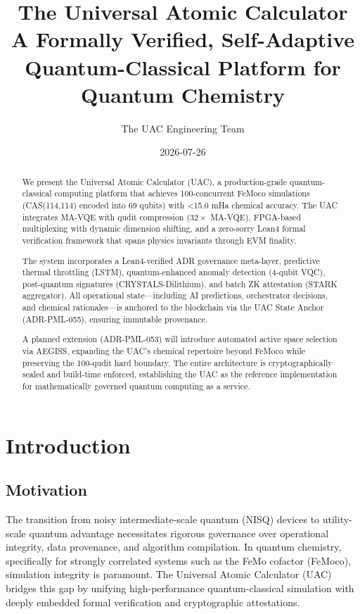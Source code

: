 \documentclass[11pt,a4paper]{article}
\title{The Universal Atomic Calculator\\ A Formally Verified, Self-Adaptive Quantum-Classical Platform for Quantum Chemistry}
\author{The UAC Engineering Team}
\date{2026-07-26}
\begin{document}
\maketitle

\begin{abstract}
We present the Universal Atomic Calculator (UAC), a production-grade quantum-classical computing platform that achieves 100-concurrent FeMoco simulations (CAS(114,114) encoded into 69 qubits) with <15.0 mHa chemical accuracy. The UAC integrates MA-VQE with qudit compression ($32\times$ MA-VQE), FPGA-based multiplexing with dynamic dimension shifting, and a zero-sorry Lean4 formal verification framework that spans physics invariants through EVM finality.

The system incorporates a Lean4-verified ADR governance meta-layer, predictive thermal throttling (LSTM), quantum-enhanced anomaly detection (4-qubit VQC), post-quantum signatures (CRYSTALS-Dilithium), and batch ZK attestation (STARK aggregator). All operational state—including AI predictions, orchestrator decisions, and chemical rationales—is anchored to the blockchain via the UAC State Anchor (ADR-PML-055), ensuring immutable provenance.

A planned extension (ADR-PML-053) will introduce automated active space selection via AEGISS, expanding the UAC's chemical repertoire beyond FeMoco while preserving the 100-qudit hard boundary. The entire architecture is cryptographically sealed and build-time enforced, establishing the UAC as the reference implementation for mathematically governed quantum computing as a service.
\end{abstract}

\tableofcontents

\section{Introduction}
\subsection{Motivation}
The transition from noisy intermediate-scale quantum (NISQ) devices to utility-scale quantum advantage necessitates rigorous governance over operational integrity, data provenance, and algorithm compilation. In quantum chemistry, specifically for strongly correlated systems such as the FeMo cofactor (FeMoco), simulation integrity is paramount. The Universal Atomic Calculator (UAC) bridges this gap by unifying high-performance quantum-classical simulation with deeply embedded formal verification and cryptographic attestations.
\end{document}

